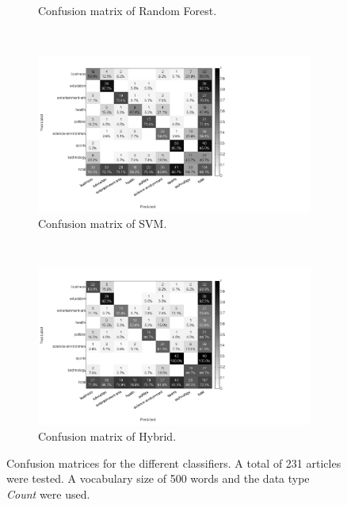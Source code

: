 \begin{figure}[H]
\begin{subfigure}[b]{\figwidth}
		\caption{Confusion matrix of Random Forest.}
		\label{fig:confmat-rf}
	\end{subfigure}
	~
	\begin{subfigure}[b]{\figwidth}
		\includegraphics[width=\textwidth,trim=0 0 350 0, clip]{img/SVM_percentile_5_count.png}
		\caption{Confusion matrix of SVM.}
		\label{fig:confmat-svm}
	\end{subfigure}
	\\
	\begin{subfigure}[b]{\figwidth}
		\includegraphics[width=\textwidth,trim=0 0 350 0, clip]{img/hybrid_percentile_5_count.png}
		\caption{Confusion matrix of Hybrid.}
		\label{fig:confmat-hybrid}
	\end{subfigure}
	\caption{Confusion matrices for the different classifiers. A total of 231 articles were tested. A vocabulary size of 500 words and the data type \emph{Count} were used.}
	\label{fig:confmat}
\end{figure}

